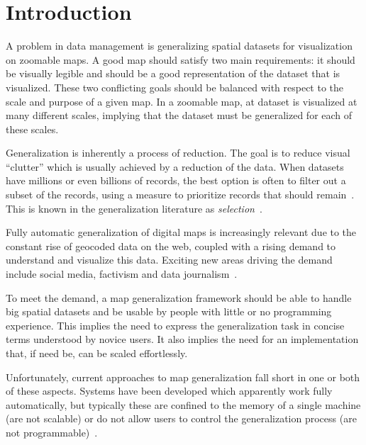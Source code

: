 \section{Introduction}
A problem in data management is generalizing spatial datasets for visualization on zoomable maps. A good map should satisfy two main requirements: it should be visually legible and should be a good representation of the dataset that is visualized. These two conflicting goals should be balanced with respect to the scale and purpose of a given map. In a zoomable map, at dataset is visualized at many different scales, implying that the dataset must be generalized for each of these scales. 

Generalization is inherently a process of reduction. The goal is to reduce visual ``clutter'' which is usually achieved by a reduction of the data. When datasets have millions or even billions of records, the best option is often to filter out a subset of the records, using a measure to prioritize records that should remain~\cite{sarma2012fusiontables}. This is known in the generalization literature as \emph{selection}~\cite{weibel1999generalising}.

Fully automatic generalization of digital maps is increasingly relevant due to the constant rise of geocoded data on the web, coupled with a rising demand to understand and visualize this data. Exciting new areas driving the demand include social media, factivism and data journalism~\cite{cohen2011journalism}. 

To meet the demand, a map generalization framework should be able to handle big spatial datasets and be usable by people with little or no programming experience. This implies the need to express the generalization task in concise terms understood by novice users. It also implies the need for an implementation that, if need be, can be scaled effortlessly.

Unfortunately, current approaches to map generalization fall short in one or both of these aspects. Systems have been developed which apparently work fully automatically, but typically these are confined to the memory of a single machine (are not scalable) or do not allow users to control the generalization process (are not programmable)~\cite{sarma2012fusiontables}. 


